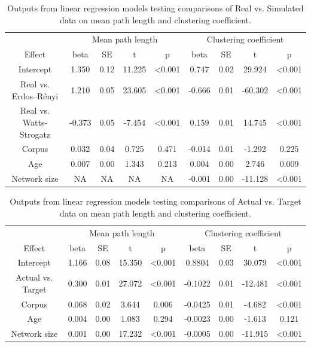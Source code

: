 \documentclass[
  man]{apa6}
\begin{document}
\begin{longtable}[t]{ccccccccc}
\caption{\label{tab:table-real-sim}Outputs from linear regression models testing comparisons of Real vs. Simulated data on mean path length and clustering coefficient.}\\
\toprule
\multicolumn{1}{c}{ } & \multicolumn{4}{c}{Mean path length} & \multicolumn{4}{c}{Clustering coefficient} \\
\cmidrule(l{3pt}r{3pt}){2-5} \cmidrule(l{3pt}r{3pt}){6-9}
Effect & beta & SE & t & p & beta & SE & t & p\\
\midrule
Intercept & 1.350 & 0.12 & 11.225 & <0.001 & 0.747 & 0.02 & 29.924 & <0.001\\
Real vs. Erdos–Rényi & 1.210 & 0.05 & 23.605 & <0.001 & -0.666 & 0.01 & -60.302 & <0.001\\
Real vs. Watts-Strogatz & -0.373 & 0.05 & -7.454 & <0.001 & 0.159 & 0.01 & 14.745 & <0.001\\
Corpus & 0.032 & 0.04 & 0.725 & 0.471 & -0.014 & 0.01 & -1.292 & 0.225\\
Age & 0.007 & 0.00 & 1.343 & 0.213 & 0.004 & 0.00 & 2.746 & 0.009\\
\addlinespace
Network size & NA & NA & NA & NA & -0.001 & 0.00 & -11.128 & <0.001\\
\bottomrule
\end{longtable}

\begin{longtable}[t]{ccccccccc}
\caption{\label{tab:table-actual-target}Outputs from linear regression models testing comparisons of Actual vs. Target data on mean path length and clustering coefficient.}\\
\toprule
\multicolumn{1}{c}{ } & \multicolumn{4}{c}{Mean path length} & \multicolumn{4}{c}{Clustering coefficient} \\
\cmidrule(l{3pt}r{3pt}){2-5} \cmidrule(l{3pt}r{3pt}){6-9}
Effect & beta & SE & t & p & beta & SE & t & p\\
\midrule
Intercept & 1.166 & 0.08 & 15.350 & <0.001 & 0.8804 & 0.03 & 30.079 & <0.001\\
Actual vs. Target & 0.300 & 0.01 & 27.072 & <0.001 & -0.1022 & 0.01 & -12.481 & <0.001\\
Corpus & 0.068 & 0.02 & 3.644 & 0.006 & -0.0425 & 0.01 & -4.682 & <0.001\\
Age & 0.004 & 0.00 & 1.083 & 0.294 & -0.0023 & 0.00 & -1.613 & 0.121\\
Network size & 0.001 & 0.00 & 17.232 & <0.001 & -0.0005 & 0.00 & -11.915 & <0.001\\
\bottomrule
\end{longtable}
\end{document}
